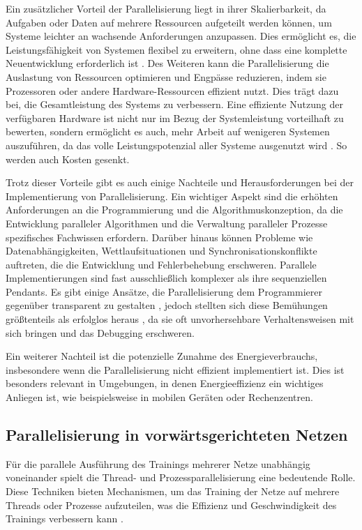 Ein zusätzlicher Vorteil der Parallelisierung liegt in ihrer Skalierbarkeit, da Aufgaben oder Daten auf mehrere Ressourcen aufgeteilt werden können, um Systeme leichter an wachsende Anforderungen anzupassen. Dies ermöglicht es, die Leistungsfähigkeit von Systemen flexibel zu erweitern, ohne dass eine komplette Neuentwicklung erforderlich ist \citep{Flynn_Computer_Organizations_and_their_Effectiveness}.
Des Weiteren kann die Parallelisierung die Auslastung von Ressourcen optimieren und Engpässe reduzieren, indem sie Prozessoren oder andere Hardware-Ressourcen effizient nutzt. Dies trägt dazu bei, die Gesamtleistung des Systems zu verbessern. Eine effiziente Nutzung der verfügbaren Hardware ist nicht nur im Bezug der Systemleistung vorteilhaft zu bewerten, sondern ermöglicht es auch, mehr Arbeit auf wenigeren Systemen auszuführen, da das volle Leistungspotenzial aller Systeme ausgenutzt wird \citep{Flynn_Computer_Organizations_and_their_Effectiveness}. So werden auch Kosten gesenkt.

Trotz dieser Vorteile gibt es auch einige Nachteile und Herausforderungen bei der Implementierung von Parallelisierung. Ein wichtiger Aspekt sind die erhöhten Anforderungen an die Programmierung und die Algorithmuskonzeption, da die Entwicklung paralleler Algorithmen und die Verwaltung paralleler Prozesse spezifisches Fachwissen erfordern. Darüber hinaus können Probleme wie Datenabhängigkeiten, Wettlaufsituationen und Synchronisationskonflikte auftreten, die die Entwicklung und Fehlerbehebung erschweren. Parallele Implementierungen sind fast ausschließlich komplexer als ihre sequenziellen Pendants. Es gibt einige Ansätze, die Parallelisierung dem Programmierer gegenüber transparent zu gestalten \citep{Sidorenko_Subway_Train_Scheduling}, jedoch stellten sich diese Bemühungen größtenteils als erfolglos heraus \citep{the_problem_with_threads}, da sie oft unvorhersehbare Verhaltensweisen mit sich bringen und das Debugging erschweren. 

Ein weiterer Nachteil ist die potenzielle Zunahme des Energieverbrauchs, insbesondere wenn die Parallelisierung nicht effizient implementiert ist. Dies ist besonders relevant in Umgebungen, in denen Energieeffizienz ein wichtiges Anliegen ist, wie beispielsweise in mobilen Geräten oder Rechenzentren.

\subsection{Parallelisierung in vorwärtsgerichteten Netzen}
\label{sec:Grundlagen_Parallelisierung_Neuronale_Netze}
Für die parallele Ausführung des Trainings mehrerer Netze unabhängig voneinander spielt die Thread- und Prozessparallelisierung eine bedeutende Rolle. Diese Techniken bieten Mechanismen, um das Training der Netze auf mehrere Threads oder Prozesse aufzuteilen, was die Effizienz und Geschwindigkeit des Trainings verbessern kann \citep{Flynn_Computer_Organizations_and_their_Effectiveness}.

